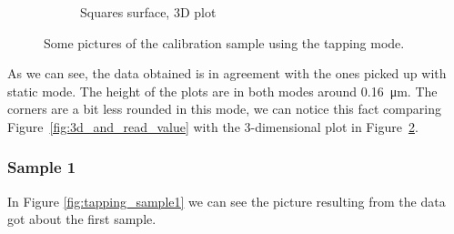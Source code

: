 \documentclass[11pt,a4paper]{article}
\begin{document}
\begin{figure}[H]
\begin{subfigure}[b]{0.42\textwidth}
\caption{Squares surface, 3D plot}
\label{fig:sm_border}
\end{subfigure}
\caption{Some pictures of the calibration sample using the tapping mode.}\label{fig:: tm cal}
\end{figure}
As we can see, the data obtained is in agreement with the ones picked up with static mode. The height of the plots are in both modes around \SI{0.16}{\micro\m}. The corners are a bit less rounded in this mode, we can notice this fact comparing Figure~\ref{fig:3d_and_read_value} with the 3-dimensional plot in Figure~\ref{fig:: tm cal}.

\subsubsection{Sample 1}
In Figure \ref{fig:tapping_sample1} we can see the picture resulting from the data got about the first sample.
\end{document}
